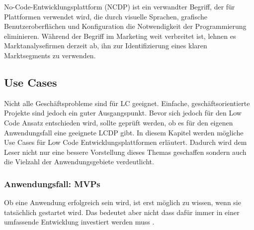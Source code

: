 \documentclass[12pt]{article} %
\begin{document}
	No-Code-Entwicklungsplattform (NCDP) ist ein verwandter Begriff, der für Plattformen verwendet wird, die durch visuelle Sprachen, grafische Benutzeroberflächen und Konfiguration die Notwendigkeit der Programmierung eliminieren. Während der Begriff im Marketing weit verbreitet ist, lehnen es Marktanalysefirmen derzeit ab, ihn zur Identifizierung eines klaren Marktsegments zu verwenden. \cite{DiRuscio.2022}
	
	
	
	
	\subsection{Use Cases}	
	Nicht alle Geschäftsprobleme sind für LC geeignet. Einfache, geschäftsorientierte Projekte sind jedoch ein guter Ausgangspunkt. 
	Bevor sich jedoch für den Low Code Ansatz entschieden wird, sollte geprüft werden, ob es für den eigenen Anwendungsfall eine geeignete LCDP gibt. %
	In diesem Kapitel werden mögliche Use Cases für Low Code Entwicklungsplattformen erläutert. Dadurch wird dem Leser nicht nur eine bessere Vorstellung dieses Themas geschaffen sondern auch die Vielzahl der Anwendungsgebiete verdeutlicht. 
	
	\subsubsection{Anwendungsfall: MVPs}
	Ob eine Anwendung erfolgreich sein wird, ist erst möglich zu wissen, wenn sie tatsächlich gestartet wird. Das bedeutet aber nicht dass dafür immer in einer umfassende Entwicklung investiert werden muss \cite{OleksiiGlib.2022}.
	
\end{document}
